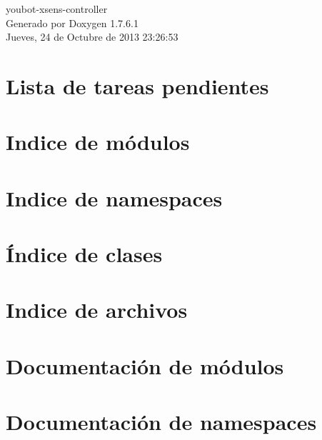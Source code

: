 \documentclass[a4paper]{book}
\begin{document}
\hypersetup{pageanchor=false,citecolor=blue}
\begin{titlepage}
\vspace*{7cm}
\begin{center}
{\Large youbot-\/xsens-\/controller }\\
\vspace*{1cm}
{\large \-Generado por Doxygen 1.7.6.1}\\
\vspace*{0.5cm}
{\small Jueves, 24 de Octubre de 2013 23:26:53}\\
\end{center}
\end{titlepage}
\clearemptydoublepage
{}
\tableofcontents
\clearemptydoublepage
{}
\hypersetup{pageanchor=true,citecolor=blue}
\chapter{\-Lista de tareas pendientes}
\label{todo}
\hypertarget{todo}{}

\chapter{\-Indice de módulos}

\chapter{\-Indice de namespaces}

\chapter{Índice de clases}

\chapter{\-Indice de archivos}

\chapter{\-Documentación de módulos}

\chapter{\-Documentación de namespaces}


\end{document}
